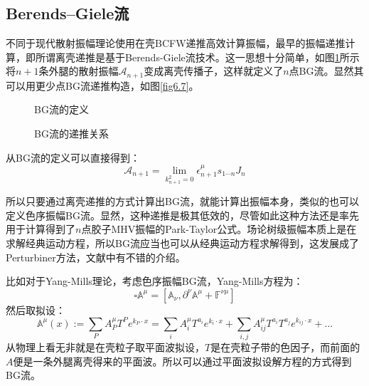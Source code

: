 \subsection{Berends–Giele流}
不同于现代散射振幅理论使用在壳BCFW递推高效计算振幅，最早的振幅递推计算，即所谓离壳递推是基于Berends-Giele流技术\cite{Berends:1987me}。这一思想十分简单，如图\ref{fig:6.6}所示将$n+1$条外腿的散射振幅$\mathcal{A}_{n+1}$变成离壳传播子，这样就定义了$n$点BG流。显然其可以用更少点BG流递推构造，如图\ref{fig6.7}。
\begin{figure}[htbp]
	\centering
	
	\caption{BG流的定义}
	\label{fig:6.6}
\end{figure}
\begin{figure}[htbp]
	\centering
	
	\caption{BG流的递推关系}
	\label{fig:6.7}
\end{figure}
从BG流的定义可以直接得到：
\begin{equation}
	\mathcal{A}_{n+1} =\lim_{k^2_{n+1}=0} \epsilon^\mu_{n+1}s_{1\cdots n}J_n
\end{equation}

所以只要通过离壳递推的方式计算出BG流，就能计算出振幅本身，类似的也可以定义色序振幅BG流。显然，这种递推是极其低效的，尽管如此这种方法还是率先用于计算得到了$n$点胶子MHV振幅的Park-Taylor公式\cite{Dixon:1996wi,Mangano:1990by}。场论树级振幅本质上是在求解经典运动方程，所以BG流应当也可以从经典运动方程求解得到，这发展成了Perturbiner方法，文献\cite{Mizera:2018jbh}中有不错的介绍。

比如对于Yang-Mills理论，考虑色序振幅BG流，Yang-Mills方程为：
\begin{equation}
	\square\mathbb{A}^{\mu}=[\mathbb{A}_{\nu},\partial^{\nu}\mathbb{A}^{\mu}+\mathbb{F}^{\nu\mu}]
\end{equation}
然后取拟设：
\begin{equation}
	\mathbb{A}^\mu(x):=\sum_PA_P^\mu T^Pe^{k_P\cdot x}=\sum_iA_i^\mu T^{a_i}e^{k_i\cdot x}+\sum_{i,j}A_{ij}^\mu T^{a_i}T^{a_j}e^{k_{ij}\cdot x}+\ldots
\end{equation}
从物理上看无非就是在壳粒子取平面波拟设，$T$是在壳粒子带的色因子，而前面的$A$便是一条外腿离壳得来的平面波。所以可以通过平面波拟设解方程的方式得到BG流。

